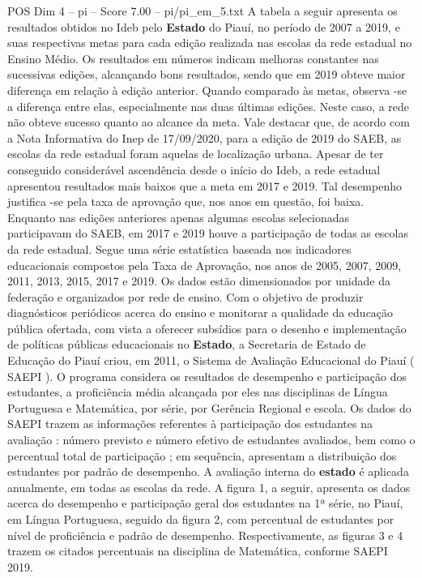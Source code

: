\begin{textsample}{POS Dim 4 – pi – Score 7.00 – pi/pi\_em\_5.txt}
A tabela a seguir apresenta os resultados obtidos no Ideb pelo \textbf{Estado} do Piauí, no período de 2007 a 2019, e suas respectivas metas para cada edição realizada nas escolas da rede estadual no Ensino Médio.
Os resultados em números indicam melhoras constantes nas sucessivas edições, alcançando bons resultados, sendo que em 2019 obteve maior diferença em relação à edição anterior.
Quando comparado às metas, observa -se a diferença entre elas, especialmente nas duas últimas edições.
Neste caso, a rede não obteve sucesso quanto ao alcance da meta.
Vale destacar que, de acordo com a Nota Informativa do Inep de 17/09/2020, para a edição de 2019 do SAEB, as escolas da rede estadual foram aquelas de localização urbana.
Apesar de ter conseguido considerável ascendência desde o início do Ideb, a rede estadual apresentou resultados mais baixos que a meta em 2017 e 2019.
Tal desempenho justifica -se pela taxa de aprovação que, nos anos em questão, foi baixa.
Enquanto nas edições anteriores apenas algumas escolas selecionadas participavam do SAEB, em 2017 e 2019 houve a participação de todas as escolas da rede estadual.
Segue uma série estatística baseada nos indicadores educacionais compostos pela Taxa de Aprovação, nos anos de 2005, 2007, 2009, 2011, 2013, 2015, 2017 e 2019.
Os dados estão dimensionados por unidade da federação e organizados por rede de ensino.
Com o objetivo de produzir diagnósticos periódicos acerca do ensino e monitorar a qualidade da educação pública ofertada, com vista a oferecer subsídios para o desenho e implementação de políticas públicas educacionais no \textbf{Estado}, a Secretaria de Estado de Educação do Piauí criou, em 2011, o Sistema de Avaliação Educacional do Piauí ( SAEPI ).
O programa considera os resultados de desempenho e participação dos estudantes, a proficiência média alcançada por eles nas disciplinas de Língua Portuguesa e Matemática, por série, por Gerência Regional e escola.
Os dados do SAEPI trazem as informações referentes à participação dos estudantes na avaliação : número previsto e número efetivo de estudantes avaliados, bem como o percentual total de participação ; em sequência, apresentam a distribuição dos estudantes por padrão de desempenho.
A avaliação interna do \textbf{estado} é aplicada anualmente, em todas as escolas da rede.
A figura 1, a seguir, apresenta os dados acerca do desempenho e participação geral dos estudantes na 1ª série, no Piauí, em Língua Portuguesa, seguido da figura 2, com percentual de estudantes por nível de proficiência e padrão de desempenho.
Respectivamente, as figuras 3 e 4 trazem os citados percentuais na disciplina de Matemática, conforme SAEPI 2019.

\end{textsample}
